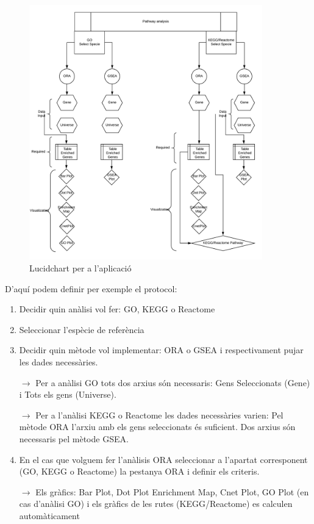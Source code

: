 \documentclass[]{article}
\begin{document}
\begin{enumerate}
\begin{figure}[H]
\centering
\includegraphics[width=0.9\textwidth]{LucidChart.png} 
\caption{Lucidchart per a l'aplicació}
\end{figure}

D'aquí podem definir per exemple el protocol:
\begin{enumerate}
\item Decidir quin anàlisi vol fer: GO, KEGG o Reactome
\item Seleccionar l'espècie de referència
\item Decidir quin mètode vol implementar: ORA o GSEA i respectivament pujar les dades necessàries.

$\rightarrow$ Per a anàlisi GO tots dos arxius són necessaris: Gens Seleccionats (Gene) i Tots els gens (Universe). 

$\rightarrow$ Per a l'anàlisi KEGG o Reactome les dades necessàries varien: Pel mètode ORA l'arxiu amb els gens seleccionats és suficient. Dos arxius són necessaris pel mètode GSEA.
\item En el cas que volguem fer l'anàlisis ORA seleccionar a l'apartat corresponent (GO, KEGG o Reactome) la pestanya ORA i definir els criteris.

$\rightarrow$ Els gràfics: Bar Plot, Dot Plot Enrichment Map, Cnet Plot, GO Plot (en cas d'anàlisi GO) i els gràfics de les rutes (KEGG/Reactome) es calculen automàticament


\end{enumerate}
\end{enumerate}
\end{document}
